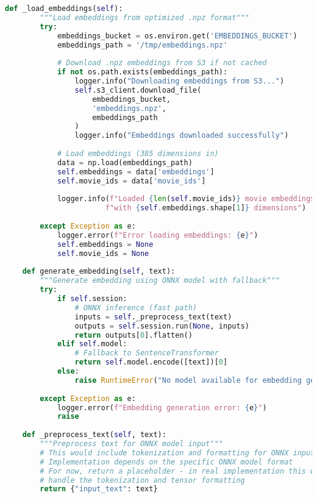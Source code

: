 \documentclass[11pt,a4paper]{article}
\begin{document}
\begin{lstlisting}[language=Python, caption=ONNX Inference Engine]
    def _load_embeddings(self):
        """Load embeddings from optimized .npz format"""
        try:
            embeddings_bucket = os.environ.get('EMBEDDINGS_BUCKET')
            embeddings_path = '/tmp/embeddings.npz'
            
            # Download .npz embeddings from S3 if not cached
            if not os.path.exists(embeddings_path):
                logger.info("Downloading embeddings from S3...")
                self.s3_client.download_file(
                    embeddings_bucket,
                    'embeddings.npz',
                    embeddings_path
                )
                logger.info("Embeddings downloaded successfully")
            
            # Load embeddings (385 dimensions in)
            data = np.load(embeddings_path)
            self.embeddings = data['embeddings']
            self.movie_ids = data['movie_ids']
            
            logger.info(f"Loaded {len(self.movie_ids)} movie embeddings "
                       f"with {self.embeddings.shape[1]} dimensions")
            
        except Exception as e:
            logger.error(f"Error loading embeddings: {e}")
            self.embeddings = None
            self.movie_ids = None
    
    def generate_embedding(self, text):
        """Generate embedding using ONNX model with fallback"""
        try:
            if self.session:
                # ONNX inference (fast path)
                inputs = self._preprocess_text(text)
                outputs = self.session.run(None, inputs)
                return outputs[0].flatten()
            elif self.model:
                # Fallback to SentenceTransformer
                return self.model.encode([text])[0]
            else:
                raise RuntimeError("No model available for embedding generation")
                
        except Exception as e:
            logger.error(f"Embedding generation error: {e}")
            raise
    
    def _preprocess_text(self, text):
        """Preprocess text for ONNX model input"""
        # This would include tokenization and formatting for ONNX input
        # Implementation depends on the specific ONNX model format
        # For now, return a placeholder - in real implementation this would
        # handle the tokenization and tensor formatting
        return {"input_text": text}
    

\end{lstlisting}
\end{document}
